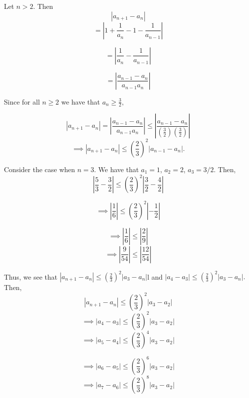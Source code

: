 \documentclass{report}
\begin{document}
\pagebreak

\begin{myproof}
    
Let $n>2$. Then $$ \left| a_{n+1}  - a_{n} \right| $$
$$= \left| 1 + \frac{1}{a_{n}}  - 1 - \frac{1}{a_{n-1}} \right| $$

$$= \left|\frac{1}{a_{n}}  - \frac{1}{a_{n-1}} \right| $$

$$= \left|\frac{ a_{n-1 } - a_n }{a_{n-1} a_n}   \right| $$

Since for all $n\geq2$ we have that $a_n \geq \frac{3}{2},$

$$ \left| a_{n+1}  - a_{n} \right| =\left|\frac{ a_{n-1 } - a_n }{a_{n-1} a_n}\right| \leq \left|\frac{ a_{n-1 } - a_n }{\left(\frac{3}{2}\right) \left(\frac{3}{2}\right)}\right|$$
$$ \implies \left| a_{n+1}  - a_{n} \right|  \leq \left(\frac{2}{3}\right)^2\left|a_{n-1 } - a_n \right|.$$

\end{myproof}

\pagebreak
{}

\sol
Consider the case when $n=3.$ We have that $a_1 = 1$, $a_2 = 2$, $a_3 = 3/2.$  Then,
$$\left|\frac{5}{3} - \frac{3}{2} \right| \leq \left(\frac{2}{3} \right)^2 \left|\frac{3}{2} - \frac{4}{2} \right|$$

$$\implies \left|\frac{1}{6}  \right| \leq \left(\frac{2}{3} \right)^2 \left| - \frac{1}{2} \right|$$

$$\implies \left|\frac{1}{6}  \right| \leq \left|\frac{2}{9} \right|$$
$$\implies \left|\frac{9}{54}  \right| \leq \left|\frac{12}{54} \right|$$

Thus, we  see that $\left|a_{n+1} - a_n\right| \leq \left(\frac{2}{3}\right)^2 \left|a_3 -a_n\right|$l and $\left|a_{4} - a_3\right| \leq \left(\frac{2}{3}\right)^2 \left|a_3 -a_n\right|.$ Then,
$$\left|a_{n+1} - a_n\right| \leq \left(\frac{2}{3}\right)^2 \left|a_3 -a_2\right|$$
$$\implies \left|a_{4} - a_3\right| \leq \left(\frac{2}{3}\right)^2 \left|a_3 -a_2\right|$$
$$\implies \left|a_{5} - a_4\right| \leq \left(\frac{2}{3}\right)^4 \left|a_3 -a_2\right|$$

$$\implies \left|a_{6} - a_5\right| \leq \left(\frac{2}{3}\right)^6 \left|a_3 -a_2\right|$$
$$\implies \left|a_{7} - a_6\right| \leq \left(\frac{2}{3}\right)^8 \left|a_3 -a_2\right|$$
\end{document}
